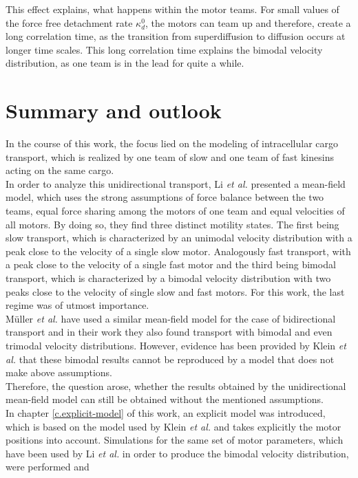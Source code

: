 This effect explains, what happens within the motor teams. For small values of the force free detachment rate $\kappa_d^0$, the motors can team up and therefore, create a long correlation time, as
the transition from superdiffusion to diffusion occurs at longer time scales. This long correlation time explains the bimodal velocity distribution, as one team is in the lead for quite a while. 

\chapter{Summary and outlook}\label{c.summary}
In the course of this work, the focus lied on the modeling of intracellular cargo transport, which is realized by one team of slow and one team of fast kinesins acting on the same cargo.\\
In order to analyze this unidirectional transport, Li \textit{et al.} \cite{li} presented a mean-field model, which uses the strong assumptions of force balance between the two teams, equal force
sharing among the motors of one team and equal velocities of all motors. By doing so, they find three distinct motility states. The first being slow transport, which is characterized by an
unimodal velocity distribution with a peak close to the velocity of a single slow motor. Analogously fast transport, with a peak close to the velocity of a single fast motor and the third
being bimodal transport, which is characterized by a bimodal velocity distribution with two peaks close to the velocity of single slow and fast motors. For this work, the last regime was of
utmost importance.\\
Müller \textit{et al.} \cite{pnas105} have used a similar mean-field model for the case of bidirectional transport and in their work they also found transport with bimodal and even trimodal velocity
distributions. However, evidence has been provided by Klein \textit{et al.} \cite{sklein} that these bimodal results cannot be reproduced by a model that does not make above assumptions. \\
Therefore, the question arose, whether the results obtained by the unidirectional mean-field model can still be obtained without the mentioned assumptions. \\
In chapter \ref{c.explicit-model} of this work, an explicit model was introduced, which is based on the model used by Klein \textit{et al.} \cite{sklein} and takes explicitly the motor
positions into account. Simulations for the same set of motor parameters, which have been used by Li \textit{et al.} in order to produce the bimodal velocity distribution, were performed and
